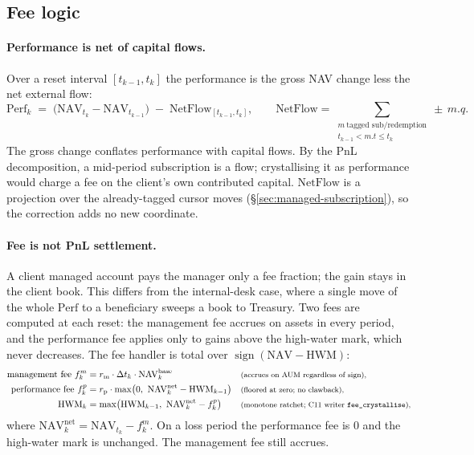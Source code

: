\subsection{Fee logic}
\label{sec:managed-fees}

\paragraph{Performance is net of capital flows.} Over a reset interval $[t_{k-1},t_k]$ the
performance is the gross NAV change less the net external flow:
\[
\mathrm{Perf}_k \;=\; \big(\mathrm{NAV}_{t_k}-\mathrm{NAV}_{t_{k-1}}\big)\;-\;
\mathrm{NetFlow}_{[t_{k-1},t_k]},\qquad
\mathrm{NetFlow}=\!\!\sum_{\substack{m\ \text{tagged sub/redemption}\\ t_{k-1}<m.t\le t_k}}\!\!\pm\,m.q.
\]
The gross change conflates performance with capital flows. By the PnL decomposition, a
mid-period subscription is a flow; crystallising it as performance would charge a fee on the
client's own contributed capital. $\mathrm{NetFlow}$ is a projection over the already-tagged
cursor moves (\S\ref{sec:managed-subscription}), so the correction adds no new coordinate.

\paragraph{Fee is not PnL settlement.} A client managed account pays the manager only a fee
fraction; the gain stays in the client book. This differs from the internal-desk case, where
a single move of the whole $\mathrm{Perf}$ to a beneficiary sweeps a book to Treasury. Two fees
are computed at each reset: the management fee accrues on assets in every period, and the
performance fee applies only to gains above the high-water mark, which never decreases. The
fee handler is total over $\operatorname{sign}(\mathrm{NAV}-\mathrm{HWM})$:
{\small\begin{align*}
\text{management fee } f^{m}_k &= r_{\text{m}}\cdot\Delta t_k\cdot \mathrm{NAV}^{\text{base}}_k
&&\text{\footnotesize(accrues on AUM regardless of sign),}\\
\text{performance fee } f^{p}_k &= r_{\text{p}}\cdot\max\!\big(0,\ \mathrm{NAV}^{\text{net}}_k-\mathrm{HWM}_{k-1}\big)
&&\text{\footnotesize(floored at zero; no clawback),}\\
\mathrm{HWM}_k &= \max\!\big(\mathrm{HWM}_{k-1},\ \mathrm{NAV}^{\text{net}}_k-f^{p}_k\big)
&&\text{\footnotesize(monotone ratchet; C11 writer \texttt{fee\_crystallise}),}
\end{align*}}
where $\mathrm{NAV}^{\text{net}}_k=\mathrm{NAV}_{t_k}-f^{m}_k$. On a loss period the
performance fee is $0$ and the high-water mark is unchanged. The management fee still
accrues.

